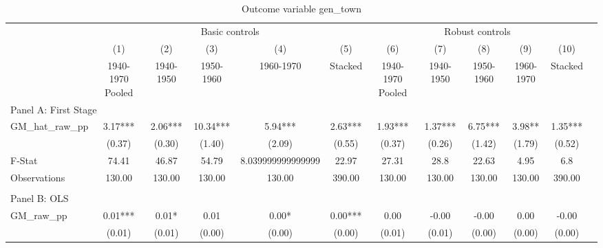  \begin{table}[htbp]\centering {} \begin{threeparttable} \caption{Outcome variable gen\_town } \begin{tabular}{l*{11}{c}} \toprule
          &\multicolumn{5}{c}{Basic controls}                                   &\multicolumn{5}{c}{Robust controls}                                  \\\cmidrule(lr){2-6}\cmidrule(lr){7-11}
          &\multicolumn{1}{c}{(1)}&\multicolumn{1}{c}{(2)}&\multicolumn{1}{c}{(3)}&\multicolumn{1}{c}{(4)}&\multicolumn{1}{c}{(5)}&\multicolumn{1}{c}{(6)}&\multicolumn{1}{c}{(7)}&\multicolumn{1}{c}{(8)}&\multicolumn{1}{c}{(9)}&\multicolumn{1}{c}{(10)}\\
          &\multicolumn{1}{c}{1940-1970 Pooled}&\multicolumn{1}{c}{1940-1950}&\multicolumn{1}{c}{1950-1960}&\multicolumn{1}{c}{1960-1970}&\multicolumn{1}{c}{Stacked}&\multicolumn{1}{c}{1940-1970 Pooled}&\multicolumn{1}{c}{1940-1950}&\multicolumn{1}{c}{1950-1960}&\multicolumn{1}{c}{1960-1970}&\multicolumn{1}{c}{Stacked}\\
\cmidrule(lr){1-11}
\multicolumn{10}{l}{Panel A: First Stage}\\
\cmidrule(lr){1-11}
GM\_hat\_raw\_pp&      3.17***&      2.06***&     10.34***&      5.94***&      2.63***&      1.93***&      1.37***&      6.75***&      3.98** &      1.35***\\
          &    (0.37)   &    (0.30)   &    (1.40)   &    (2.09)   &    (0.55)   &    (0.37)   &    (0.26)   &    (1.42)   &    (1.79)   &    (0.52)   \\
\midrule
F-Stat    &     74.41   &     46.87   &     54.79   &8.039999999999999   &     22.97   &     27.31   &      28.8   &     22.63   &      4.95   &       6.8   \\
Observations&    130.00   &    130.00   &    130.00   &    130.00   &    390.00   &    130.00   &    130.00   &    130.00   &    130.00   &    390.00   \\
\cmidrule[\heavyrulewidth](lr){1-11} \\ \cmidrule[\heavyrulewidth](lr){1-11}
\multicolumn{10}{l}{Panel B: OLS}\\
\cmidrule(lr){1-11}
GM\_raw\_pp &      0.01***&      0.01*  &      0.01   &      0.00*  &      0.00***&      0.00   &     -0.00   &     -0.00   &      0.00   &     -0.00   \\
          &    (0.01)   &    (0.01)   &    (0.00)   &    (0.00)   &    (0.00)   &    (0.01)   &    (0.01)   &    (0.00)   &    (0.00)   &    (0.00)   \\

\end{tabular}
\end{threeparttable}
\end{table}
